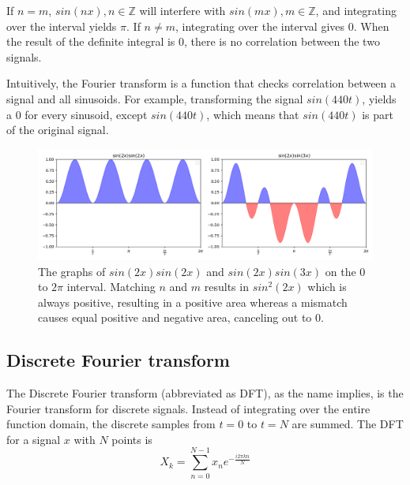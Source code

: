 If $n = m $, $sin(nx), n\in\mathbb{Z}$ will interfere with $sin(mx), m\in\mathbb{Z}$, and integrating over the interval yields $\pi$. If $n \neq m$, integrating over the interval gives 0. When the result of the definite integral is 0, there is no correlation between the two signals. 

Intuitively, the Fourier transform is a function that checks correlation between a signal and all sinusoids. For example, transforming the signal $sin(440t)$, yields a 0 for every sinusoid, except $sin(440t)$, which means that $sin(440t)$ is part of the original signal.

\begin{figure}[ht]
    \centering
    \includegraphics[width=\textwidth]{./images/transformIdea.png}
    \caption{The graphs of $sin(2x)sin(2x)$ and $sin(2x)sin(3x)$ on the $0$ to $2\pi$ interval. Matching $n$ and $m$ results in $sin^2(2x)$ which is always positive, resulting in a positive area whereas a mismatch causes equal positive and negative area, canceling out to 0.\label{fig:transformIdea}}
\end{figure}

\subsection{Discrete Fourier transform} 
The Discrete Fourier transform (abbreviated as DFT), as the name implies, is the Fourier transform for discrete signals. Instead of integrating over the entire function domain, the discrete samples from $t=0$ to $t=N$ are summed. The DFT for a signal $x$ with $N$ points is 
$$X_k = \sum_{n=0}^{N-1} x_ne^{-\frac{i2\pi kn}{N}}$$

